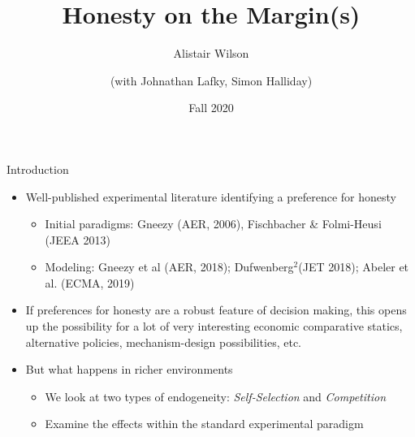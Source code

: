 \documentclass{beamer}
\begin{document}
    \date{Fall 2020}
    \title{Honesty on the Margin(s)}
    \author{Alistair Wilson\and  (with Johnathan Lafky, Simon Halliday)}
    \maketitle

\begin{frame}{Introduction}
    \begin{itemize}
        \item Well-published experimental literature identifying a preference for
        honesty
            \begin{itemize}
                \item Initial paradigms: Gneezy (AER, 2006), Fischbacher \& Folmi-Heusi
                (JEEA 2013)
                \item Modeling: Gneezy et al (AER, 2018); Dufwenberg$^{2}$(JET 2018); Abeler
                et al. (ECMA, 2019)
            \end{itemize}
        \item If preferences for honesty are a robust feature of decision making, this opens up the possibility for a lot of very interesting economic comparative statics, alternative policies, mechanism-design possibilities, etc.\pause
        \item But what happens in richer environments
            \begin{itemize}
                \item We look at two types of endogeneity: \emph{Self-Selection} and \emph{Competition}
                \item Examine the effects within the standard experimental paradigm
            \end{itemize}
    \end{itemize}
\end{frame}
\end{document}
